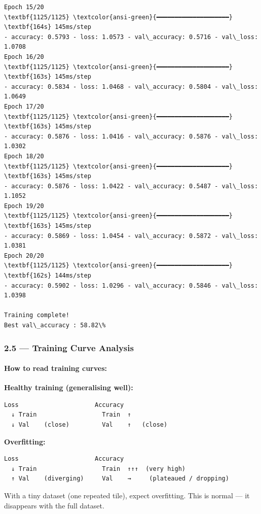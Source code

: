 \documentclass[11pt]{article}
\begin{document}
\begin{Verbatim}[commandchars=\\\{\}]
Epoch 15/20
\textbf{1125/1125} \textcolor{ansi-green}{━━━━━━━━━━━━━━━━━━━━} \textbf{164s} 145ms/step
- accuracy: 0.5793 - loss: 1.0573 - val\_accuracy: 0.5716 - val\_loss: 1.0708
Epoch 16/20
\textbf{1125/1125} \textcolor{ansi-green}{━━━━━━━━━━━━━━━━━━━━} \textbf{163s} 145ms/step
- accuracy: 0.5834 - loss: 1.0468 - val\_accuracy: 0.5804 - val\_loss: 1.0649
Epoch 17/20
\textbf{1125/1125} \textcolor{ansi-green}{━━━━━━━━━━━━━━━━━━━━} \textbf{163s} 145ms/step
- accuracy: 0.5876 - loss: 1.0416 - val\_accuracy: 0.5876 - val\_loss: 1.0302
Epoch 18/20
\textbf{1125/1125} \textcolor{ansi-green}{━━━━━━━━━━━━━━━━━━━━} \textbf{163s} 145ms/step
- accuracy: 0.5876 - loss: 1.0422 - val\_accuracy: 0.5487 - val\_loss: 1.1052
Epoch 19/20
\textbf{1125/1125} \textcolor{ansi-green}{━━━━━━━━━━━━━━━━━━━━} \textbf{163s} 145ms/step
- accuracy: 0.5869 - loss: 1.0454 - val\_accuracy: 0.5872 - val\_loss: 1.0381
Epoch 20/20
\textbf{1125/1125} \textcolor{ansi-green}{━━━━━━━━━━━━━━━━━━━━} \textbf{162s} 144ms/step
- accuracy: 0.5902 - loss: 1.0296 - val\_accuracy: 0.5846 - val\_loss: 1.0398

Training complete!
Best val\_accuracy : 58.82\%
    \end{Verbatim}

    \subsubsection{2.5 --- Training Curve
Analysis}\label{training-curve-analysis}

\paragraph{How to read training
curves:}\label{how-to-read-training-curves}

\textbf{Healthy training (generalising well):}

\begin{verbatim}
Loss                     Accuracy
  ↓ Train                  Train  ↑
  ↓ Val    (close)         Val    ↑   (close)
\end{verbatim}

\textbf{Overfitting:}

\begin{verbatim}
Loss                     Accuracy
  ↓ Train                  Train  ↑↑↑  (very high)
  ↑ Val    (diverging)     Val    →     (plateaued / dropping)
\end{verbatim}

With a tiny dataset (one repeated tile), expect overfitting. This is
normal --- it disappears with the full dataset.
\end{document}
